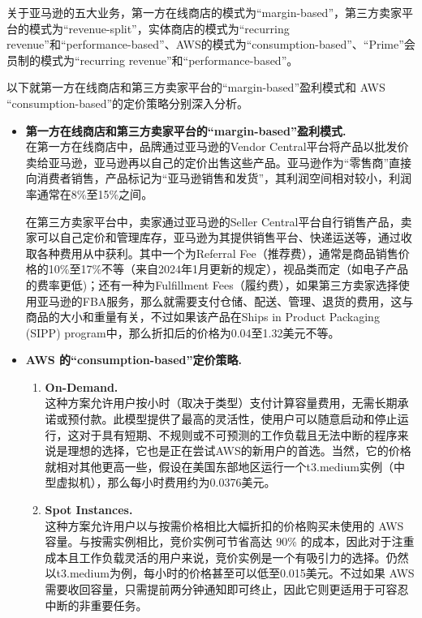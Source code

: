 \documentclass[12pt]{ctexart}
\begin{document}
关于亚马逊的五大业务，第一方在线商店的模式为“margin-based”，第三方卖家平台的模式为“revenue-split”，实体商店的模式为“recurring revenue”和“performance-based”、AWS的模式为“consumption-based”、“Prime”会员制的模式为“recurring revenue”和“performance-based”。

以下就第一方在线商店和第三方卖家平台的“margin-based”盈利模式和 AWS “consumption-based”的定价策略分别深入分析。
\begin{itemize}
    \item \textbf{第一方在线商店和第三方卖家平台的“margin-based”盈利模式.} \\
    在第一方在线商店中，品牌通过亚马逊的Vendor Central平台将产品以批发价卖给亚马逊，亚马逊再以自己的定价出售这些产品。亚马逊作为“零售商”直接向消费者销售，产品标记为“亚马逊销售和发货”，其利润空间相对较小，利润率通常在8\%至15\%之间\cite{33}。

    在第三方卖家平台中，卖家通过亚马逊的Seller Central平台自行销售产品，卖家可以自己定价和管理库存，亚马逊为其提供销售平台、快递运送等，通过收取各种费用从中获利。其中一个为Referral Fee（推荐费），通常是商品销售价格的10\%至17\%不等（来自2024年1月更新的规定\cite{34}），视品类而定（如电子产品的费率更低)；还有一种为Fulfillment Fees（履约费），如果第三方卖家选择使用亚马逊的FBA服务，那么就需要支付仓储、配送、管理、退货的费用，这与商品的大小和重量有关，不过如果该产品在Ships in Product Packaging (SIPP) program中，那么折扣后的价格为0.04至1.32美元不等\cite{34}。
    
    \item \textbf{AWS 的“consumption-based”定价策略.} \cite{36}
    \begin{enumerate}
        \item \textbf{On-Demand.} \\
        这种方案允许用户按小时（取决于类型）支付计算容量费用，无需长期承诺或预付款。此模型提供了最高的灵活性，使用户可以随意启动和停止运行，这对于具有短期、不规则或不可预测的工作负载且无法中断的程序来说是理想的选择，它也是正在尝试AWS的新用户的首选。当然，它的价格就相对其他更高一些，假设在美国东部地区运行一个t3.medium实例（中型虚拟机），那么每小时费用约为0.0376美元。
        
        \item \textbf{Spot Instances.} \\
        这种方案允许用户以与按需价格相比大幅折扣的价格购买未使用的 AWS 容量。与按需实例相比，竞价实例可节省高达 90\% 的成本，因此对于注重成本且工作负载灵活的用户来说，竞价实例是一个有吸引力的选择。仍然以t3.medium为例，每小时的价格甚至可以低至0.015美元。不过如果 AWS 需要收回容量，只需提前两分钟通知即可终止，因此它则更适用于可容忍中断的非重要任务。
        

\end{enumerate}
\end{itemize}
\end{document}

